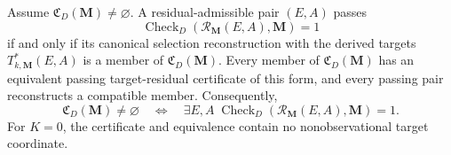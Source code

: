 Assume \(\mathfrak C_D(\mathbf M)\ne\varnothing\).  A residual-admissible pair \((E,A)\) passes
\[
\operatorname{Check}_{D}(\mathcal R_{\mathbf M}(E,A),\mathbf M)=1
\]
if and only if its canonical selection reconstruction with the derived targets \(T^*_{k,\mathbf M}(E,A)\) is a member of \(\mathfrak C_D(\mathbf M)\).  Every member of \(\mathfrak C_D(\mathbf M)\) has an equivalent passing target-residual certificate of this form, and every passing pair reconstructs a compatible member.  Consequently,
\[
\mathfrak C_D(\mathbf M)\ne\varnothing
\quad\Longleftrightarrow\quad
\exists E,A\;
\operatorname{Check}_{D}\!\left(\mathcal R_{\mathbf M}(E,A),\mathbf M\right)=1.
\]
For \(K=0\), the certificate and equivalence contain no nonobservational target coordinate.